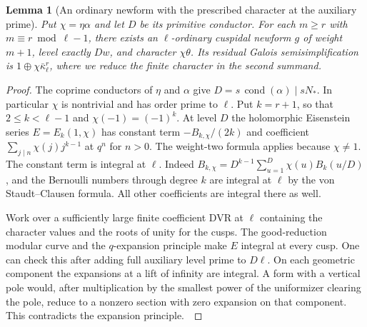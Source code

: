 \documentclass[a4paper,11pt]{article}
\newtheorem{lemma}[proposition]{Lemma}
\theoremstyle{definition}
\theoremstyle{remark}
\numberwithin{equation}{section}
\begin{document}
\begin{lemma}[An ordinary newform with the prescribed character at the auxiliary prime]
\label{lem:cusp361}
Put \(\chi=\eta\alpha\) and let \(D\) be its primitive conductor.
For each \(m\ge r\) with \(m\equiv r\bmod\ell-1\), there exists
an \(\ell\)-ordinary cuspidal newform \(g\) of weight \(m+1\),
level exactly \(Dw\), and character \(\chi\theta\). Its residual
Galois semisimplification is \(1\oplus\chi\bar\kappa_\ell^r\),
where we reduce the finite character in the second summand.
\end{lemma}
\begin{proof}
The coprime conductors of \(\eta\) and \(\alpha\) give
\(D=s\,\operatorname{cond}(\alpha)\mid sN_*\). In particular \(\chi\)
is nontrivial and has order prime to \(\ell\). Put \(k=r+1\), so that \(2\le k<\ell-1\) and \(\chi(-1)=(-1)^k\).
At level \(D\) the holomorphic Eisenstein series
\(E=E_k(1,\chi)\) has constant term \(-B_{k,\chi}/(2k)\) and
coefficient \(\sum_{j\mid n}\chi(j)j^{k-1}\) at \(q^n\) for
\(n>0\). The weight-two formula applies because \(\chi\ne1\).
The constant term is integral at \(\ell\). Indeed
\(B_{k,\chi}=D^{k-1}\sum_{u=1}^D\chi(u)B_k(u/D)\), and the
Bernoulli numbers through degree \(k\) are integral at \(\ell\)
by the von Staudt--Clausen formula. All other coefficients are
integral there as well.~\cite{VII-V-V-newforms,VII-V-billerey361}

Work over a sufficiently large finite coefficient DVR at \(\ell\)
containing the character values and the roots of unity for the
cusps. The good-reduction modular curve and the \(q\)-expansion
principle make \(E\) integral at every cusp. One can check this
after adding full auxiliary level prime to \(D\ell\). On each
geometric component the expansions at a lift of infinity are
integral. A form with a vertical pole would, after multiplication
by the smallest power of the uniformizer clearing the pole,
reduce to a nonzero section with zero expansion on that
component. This contradicts the expansion principle.~\cite{VII-V-katz361}


\end{proof}
\end{document}
